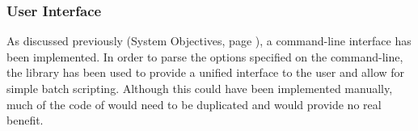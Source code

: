 \subsubsection{User Interface}
As discussed previously (System Objectives, page \pageref{text:spec:objective:cli}), a command-line interface has been implemented. In order to parse the options specified on the command-line, the  library has been used to provide a unified interface to the user and allow for simple batch scripting. Although this could have been implemented manually, much of the code of  would need to be duplicated and would provide no real benefit.
\begin{comment}
\subsection{Hardware \& Storage}
\begin{itemize}
	\item Hardware
	\begin{itemize}
		\item Fast processor
		\item Lots of HDD space for music itself, not much on top of that
	\end{itemize}
	\item Storage
	\begin{itemize}
		\item Seperate files easier to code \& debug
		\item Database slightly less reliable (moved files need to be recalculated) but much faster \& tidier
		\item Data stored on each track needs to be small so as not to take too much disk space
	\end{itemize}
\end{itemize}	
\end{comment}

